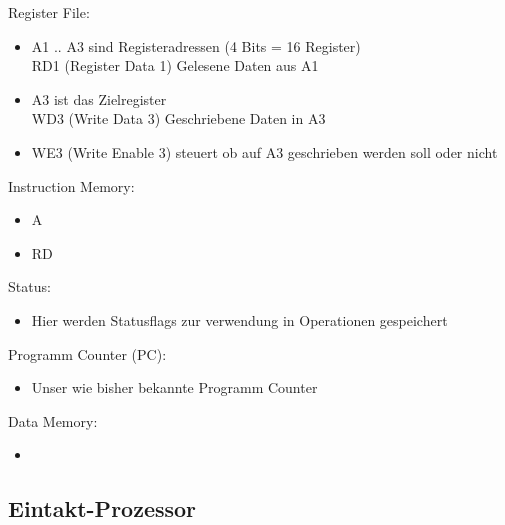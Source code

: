 			\begin{minipage}{0.45\textwidth}
				Register File:
				\begin{itemize}
					\item A1 .. A3 sind Registeradressen (4 Bits = 16 Register) \\
						RD1 (Register Data 1) Gelesene Daten aus A1
					\item A3 ist das Zielregister \\ 
						WD3 (Write Data 3) Geschriebene Daten in A3
					\item WE3 (Write Enable 3) steuert ob auf A3 geschrieben werden soll oder nicht \\
				\end{itemize}

				Instruction Memory:
				\begin{itemize}
					\item A
					\item RD
				\end{itemize}

			\end{minipage}
			\hspace{0.5cm}
			\begin{minipage}{0.45\textwidth}
				Status:
				\begin{itemize}
					\item Hier werden Statusflags zur verwendung in Operationen gespeichert \\
				\end{itemize}

				Programm Counter (PC):
				\begin{itemize}
					\item Unser wie bisher bekannte Programm Counter \\
				\end{itemize}

				Data Memory:
				\begin{itemize}
					\item 
				\end{itemize}
			\end{minipage}
			

	\vspace{0.8cm}
	\subsection{Eintakt-Prozessor}
